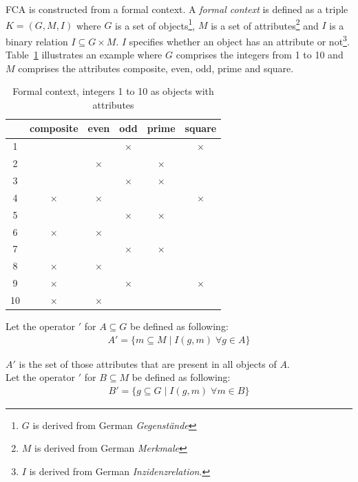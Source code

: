 \documentclass[11pt]{report}
\begin{document}
FCA \cite{Ganter2012} is constructed from a formal context. A \textit{formal context} is defined as a triple $K = (G, M, I)$ where $G$ is a set of objects\footnote{$G$ is derived from German \textit{Gegenstände}}, $M$ is a set of attributes\footnote{$M$ is derived from German \textit{Merkmale}} and $I$ is a binary relation $I \subseteq G \times M$. $I$ specifies whether an object has an attribute or not\footnote{$I$ is derived from German \textit{Inzidenzrelation}.}. Table~\ref{table:example} illustrates an example where $G$ comprises the integers from 1 to 10 and $M$ comprises the attributes composite, even, odd, prime and square. \\


\begin{table}[h]
\caption{Formal context, integers 1 to 10 as objects with attributes}
\label{table:example}
\centering

\def\arraystretch{1.2}%
\begin{tabular}{ | c | c c c c c |}
\hline
  & composite & even & odd & prime & square\\
\hline

1 & & & $\times$ & &$\times$\\ 
2 & & $\times$ & & $\times$ &\\
3 & & & $\times$ & $\times$ &\\ 
4 & $\times$ & $\times$ & & & $\times$\\
5 & & & $\times$ & $\times$ &\\
6 & $\times$ & $\times$ & & &\\
7 & & & $\times$ & $\times$ &\\ 
8 & $\times$ & $\times$ & & &\\
9 & $\times$ & & $\times$ & & $\times$\\
10 & $\times$ & $\times$ & & &\\ \hline


\end{tabular}
\end{table}

Let the operator $'$ for $A \subseteq G$ be defined as following:
\begin{align*}
	A' = \{ m \subseteq M\; |\;  I(g, m)\;   \forall g \in A\}
\end{align*}

$A'$ is the set of those attributes that are present in all objects of $A$. \\

Let the operator $'$ for $B \subseteq M$ be defined as following:
\begin{align*}
	B' = \{ g \subseteq G\; |\;  I(g, m)\;   \forall m \in B\}
\end{align*}
\end{document}
